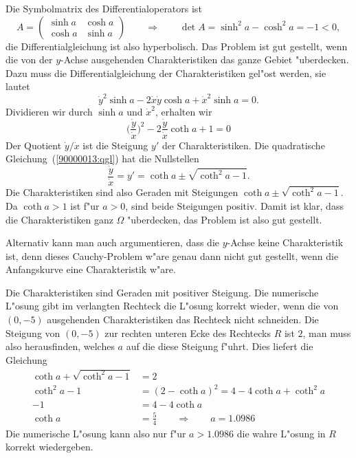 \begin{loesung}
\begin{teilaufgaben}
\item
Die Symbolmatrix des Differentialoperators ist
\[
A=\begin{pmatrix}\sinh a&\cosh a \\ \cosh a&\sinh a\end{pmatrix}
\qquad\Rightarrow\qquad
\det A=\sinh^2 a - \cosh^2 a = -1<0,
\]
die Differentialgleichung ist also hyperbolisch.
Das Problem ist gut gestellt, wenn die von der $y$-Achse ausgehenden
Charakteristiken das ganze Gebiet "uberdecken. 
Dazu muss die Differentialgleichung der Charakteristiken gel"ost werden,
sie lautet
\[
\dot y^2
\sinh a
-2
\dot x\dot y
\cosh a
+
\dot x^2
\sinh a
=0.
\]
Dividieren wir durch $\sinh a $ und $\dot x^2$, erhalten wir
\begin{equation}
\biggl(\frac{\dot y}{\dot x}\biggr)^2
-2\frac{\dot y}{\dot x} \coth a + 1=0
\label{90000013:qgl}
\end{equation}
Der Quotient $\dot y/\dot x$ ist die Steigung $y'$ der Charakteristiken.
Die quadratische Gleichung~(\ref{90000013:qgl}) hat die Nullstellen
\[
\frac{\dot y}{\dot x}=y'=
\coth a\pm\sqrt{\coth^2 a-1}
.
\]
Die Charakteristiken sind also Geraden mit Steigungen
$\coth a\pm\sqrt{\coth^2a-1}$.
Da $\coth a>1$ ist f"ur $a>0$, sind beide Steigungen positiv.
Damit ist klar, dass die Charakteristiken ganz $\Omega$ "uberdecken, das
Problem ist also gut gestellt.

Alternativ kann man auch argumentieren, dass die $y$-Achse keine 
Charakteristik ist, denn dieses Cauchy-Problem w"are genau dann
nicht gut gestellt, wenn die Anfangskurve eine Charakteristik w"are.
\item
Die Charakteristiken sind Geraden mit positiver Steigung.
Die numerische L"osung gibt im verlangten Rechteck die L"osung
korrekt wieder, wenn die von $(0,-5)$ ausgehenden Charakteristiken
das Rechteck nicht schneiden.
Die Steigung von $(0,-5)$ zur rechten unteren Ecke des Rechtecks $R$
ist $2$, 
man muss also herausfinden, welches $a$ auf die diese Steigung f"uhrt.
Dies liefert die Gleichung
\begin{align*}
\coth a + \sqrt{\coth^2 a-1}&=2
\\
\coth^2 a-1&=(2-\coth a)^2=4-4\coth a +\coth^2 a
\\
-1 &=4-4\coth a
\\
\coth a&=\frac54
\qquad\Rightarrow\qquad
a=1.0986
\end{align*}
Die numerische L"osung kann also nur f"ur $a>1.0986$ die wahre L"osung in
$R$ korrekt wiedergeben.
\qedhere
\end{teilaufgaben}
\end{loesung}
